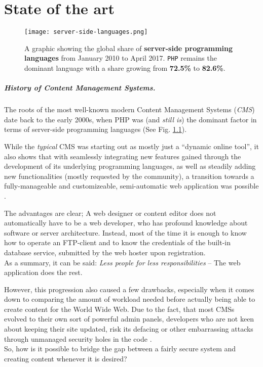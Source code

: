 \chapter{State of the art}
\label{cha:state-of-the-art}

\begin{figure}[p]
    \centering
    \texttt{[image: server-side-languages.png]}
    \caption{A graphic showing the global share of \textbf{server-side programming languages} from January 2010 to April 2017. \texttt{PHP} remains the dominant language with a share growing from \textbf{72.5\%} to \textbf{82.6\%}.}
    \label{fig:server-side-languages}
\end{figure}
%

\paragraph{History of Content Management Systems.}
The roots of the most well-known modern Content Management Systems (\emph{CMS}) date back to the early 2000s, when PHP was (and \emph{still is}) the dominant factor in terms of server-side programming languages (See Fig. \ref{fig:server-side-languages}). %

While the \emph{typical} CMS was starting out as mostly just a ``dynamic online tool'', it also shows that with seamlessly integrating new features gained through the development of its underlying programming languages, as well as steadily adding new functionalities (mostly requested by the community), a transition towards a fully-manageable and customizeable, semi-automatic web application was possible \cite[17]{dhillon2016}.

The advantages are clear; A web designer or content editor does not automatically have to be a web developer, who has profound knowledge about software or server architecture. Instead, most of the time it is enough to know how to operate an FTP-client and to know the credentials of the built-in database service, submitted by the web hoster upon registration.\\
As a summary, it can be said: \emph{Less people for less responsibilities} -- The web application does the rest.

However, this progression also caused a few drawbacks, especially when it comes down to comparing the amount of workload needed before actually being able to create content for the World Wide Web. Due to the fact, that most CMSs evolved to their own sort of powerful admin panels, developers who are not keen about keeping their site updated, risk its defacing or other embarrassing attacks through unmanaged security holes in the code \cite[23]{dhillon2016}.\\
So, how is it possible to bridge the gap between a fairly secure system and creating content whenever it is desired?

